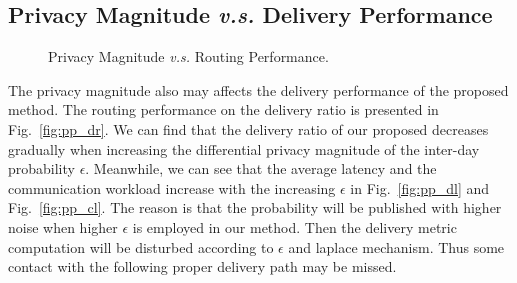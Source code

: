 \subsection{Privacy Magnitude {\it v.s.} Delivery Performance}
\begin{figure}
  \centering
  \caption{Privacy Magnitude {\it v.s.} Routing Performance.}
  \label{fig:pp_routing}
\end{figure}
The privacy magnitude also may affects the delivery performance of the proposed method.
The routing performance on the delivery ratio is presented in Fig.~\ref{fig:pp_dr}.
We can find that the delivery ratio of our proposed decreases gradually
when increasing the differential privacy magnitude of the inter-day probability $\epsilon$.
Meanwhile, we can see that the average latency and the communication workload increase
with the increasing $\epsilon$ in Fig.~\ref{fig:pp_dl} and Fig.~\ref{fig:pp_cl}.
The reason is that the probability will be published with higher noise
when higher $\epsilon$ is employed in our method.
Then the delivery metric computation will be disturbed according to $\epsilon$ and laplace mechanism.
Thus some contact with the following proper delivery path may be missed.

